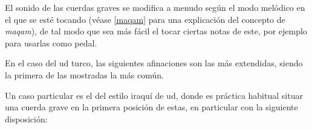 El sonido de las cuerdas graves se modifica a menudo según el modo melódico en el que se esté tocando (véase \ref{maqam} para una explicación del concepto de \emph{maqam}), de tal modo que sea más fácil el tocar ciertas notas de este, por ejemplo para usarlas como pedal.

En el caso del ud turco, las siguientes afinaciones son las más extendidas, siendo la primera de las mostradas la más común.

\begin{center}
\end{center}

Un caso particular es el del estilo iraquí de ud, donde es práctica habitual situar una cuerda grave en la primera posición de estas, en particular con la siguiente disposición:

\begin{center}
\end{center}


